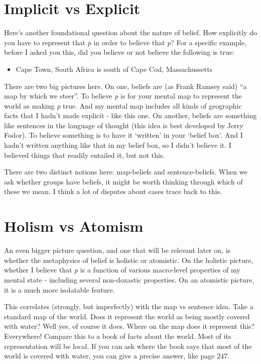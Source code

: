 \section{Implicit vs Explicit}
\label{implicitvsexplicit}

Here's another foundational question about the nature of belief. How explicitly do you have to represent that \emph{p} in order to believe that \emph{p}? For a specific example, before I asked you this, did you believe or not believe the following is true:

\begin{itemize}
\item{} Cape Town, South Africa is south of Cape Cod, Massachussetts

\end{itemize}
There are two big pictures here. On one, beliefs are (as Frank Ramsey said) ``a map by which we steer''. To believe \emph{p} is for your mental map to represent the world as making \emph{p} true. And my mental map includes all kinds of geographic facts that I hadn't made explicit - like this one. On another, beliefs are something like sentences in the language of thought (this idea is best developed by Jerry Fodor). To believe something is to have it `written' in your `belief box'. And I hadn't written anything like that in my belief box, so I didn't believe it. I believed things that readily entailed it, but not this.

There are two distinct notions here: map-beliefs and sentence-beliefs. When we ask whether groups have beliefs, it might be worth thinking through which of these we mean. I think a lot of disputes about cases trace back to this.

\section{Holism vs Atomism}
\label{holismvsatomism}

An even bigger picture question, and one that will be relevant later on, is whether the metaphysics of belief is holistic or atomistic. On the holistic picture, whether I believe that \emph{p} is a function of various macro-level properties of my mental state - including several non-doxastic properties. On an atomistic picture, it is a much more isolatable feature.

This correlates (strongly, but imperfectly) with the map vs sentence idea. Take a standard map of the world. Does it represent the world as being mostly covered with water? Well yes, of course it does. Where on the map does it represent this? Everywhere! Compare this to a book of facts about the world. Most of its representation will be local. If you can ask where the book says that most of the world is covered with water, you can give a precise answer, like page 247.

